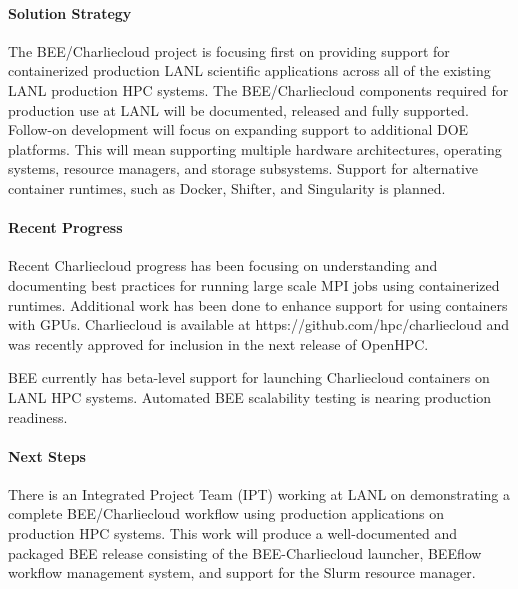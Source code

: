 \paragraph{Solution Strategy}
The BEE/Charliecloud project is focusing first on providing support for
containerized production LANL scientific applications across all of the
existing LANL production HPC systems.  The BEE/Charliecloud components required
for production use at LANL will be documented, released and fully supported.
Follow-on development will focus on expanding support to additional DOE
platforms.  This will mean supporting multiple hardware architectures,
operating systems, resource managers, and storage subsystems.  Support for
alternative container runtimes, such as Docker, Shifter, and Singularity is
planned.

\paragraph{Recent Progress}
Recent Charliecloud progress has been focusing on understanding and documenting
best practices for running large scale MPI jobs using containerized runtimes.
Additional work has been done to enhance support for using containers with
GPUs.  Charliecloud is available at https://github.com/hpc/charliecloud and was
recently approved for inclusion in the next release of OpenHPC.

BEE currently has beta-level support for launching Charliecloud containers on
LANL HPC systems.  Automated BEE scalability testing is nearing production
readiness.

\paragraph{Next Steps}
There is an Integrated Project Team (IPT) working at LANL on demonstrating a
complete BEE/Charliecloud workflow using production applications on production
HPC systems.  This work will produce a well-documented and packaged BEE release
consisting of the BEE-Charliecloud launcher, BEEflow workflow management
system, and support for the Slurm resource manager.
